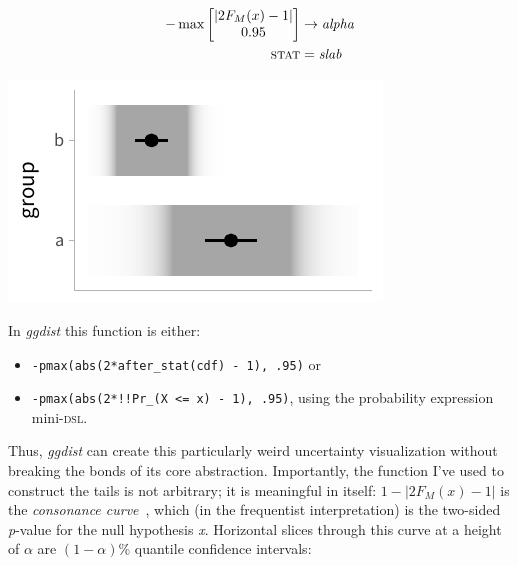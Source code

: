 \documentclass[journal]{vgtc}              %
\begin{document}
\noindent
\begin{minipage}{.5\columnwidth}

\begin{align*}
-\max \left[ \begin{matrix} \lvert 2 F_M(x) - 1 \rvert \\ 0.95 \end{matrix} \right] &\rightarrow \textit{alpha}\\
\textsc{stat} &= \mathit{slab}
\end{align*}
\end{minipage}%
  \begin{minipage}{.4\columnwidth}
    \centering
    \includegraphics[width=1.2\columnwidth]{figs/3-slab_gradient_correll.pdf}
  \end{minipage}
\hfill\break

In \textit{ggdist} this function is either:
\begin{itemize}
    \item \texttt{-pmax(abs(2*after\_stat(cdf) - 1), .95)} or
    \item    \texttt{-pmax(abs(2*!!Pr\_(X <= x) - 1), .95)}, using the probability expression mini-\textsc{dsl}.
\end{itemize}

Thus, \textit{ggdist} can create this particularly weird uncertainty visualization without breaking the bonds of its core abstraction. Importantly, the function I've used to construct the tails is not arbitrary; it is meaningful in itself: $1 - \lvert 2 F_M(x) - 1 \rvert$ is the \textit{consonance curve}~\cite{amrhein2022discuss}, which (in the frequentist interpretation) is the two-sided \textit{p}-value for the null hypothesis \textit{x}. Horizontal slices through this curve at a height of $\alpha$ are $(1 - \alpha)\%$ quantile confidence intervals:
\end{document}
